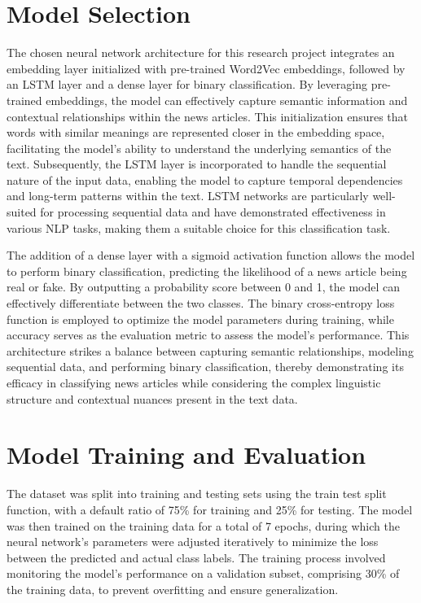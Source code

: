\section{Model Selection}

The chosen neural network architecture for this research project integrates an embedding layer initialized with pre-trained Word2Vec embeddings, followed by an LSTM layer and a dense layer for binary classification. By leveraging pre-trained embeddings, the model can effectively capture semantic information and contextual relationships within the news articles. This initialization ensures that words with similar meanings are represented closer in the embedding space, facilitating the model's ability to understand the underlying semantics of the text. Subsequently, the LSTM layer is incorporated to handle the sequential nature of the input data, enabling the model to capture temporal dependencies and long-term patterns within the text. LSTM networks are particularly well-suited for processing sequential data and have demonstrated effectiveness in various NLP tasks, making them a suitable choice for this classification task.

The addition of a dense layer with a sigmoid activation function allows the model to perform binary classification, predicting the likelihood of a news article being real or fake. By outputting a probability score between 0 and 1, the model can effectively differentiate between the two classes. The binary cross-entropy loss function is employed to optimize the model parameters during training, while accuracy serves as the evaluation metric to assess the model's performance. This architecture strikes a balance between capturing semantic relationships, modeling sequential data, and performing binary classification, thereby demonstrating its efficacy in classifying news articles while considering the complex linguistic structure and contextual nuances present in the text data.


\section{Model Training and Evaluation}
The dataset was split into training and testing sets using the train test split function, with a default ratio of 75\% for training and 25\% for testing. The model was then trained on the training data for a total of 7 epochs, during which the neural network's parameters were adjusted iteratively to minimize the loss between the predicted and actual class labels. The training process involved monitoring the model's performance on a validation subset, comprising 30\% of the training data, to prevent overfitting and ensure generalization.
